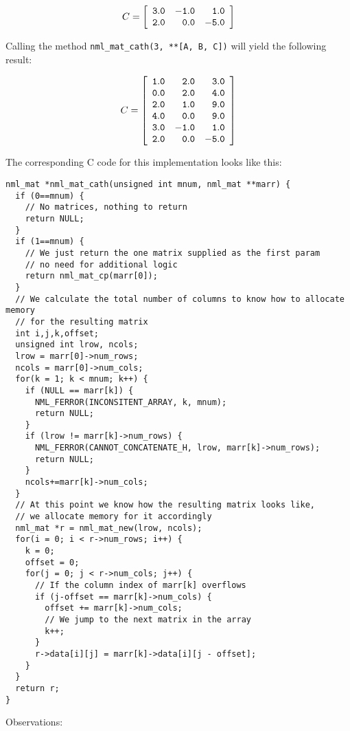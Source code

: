 $$
C = \left[
\begin{array}{rrr}
\tt 3.0 & \tt -1.0 & \tt 1.0 \\
\tt 2.0 & \tt 0.0 & \tt -5.0
\end{array}
\right]
$$

Calling the method {\tt nml\_mat\_cath(3, **[A, B, C])} will yield the following result:

$$
C = \left[
\begin{array}{rrr}
\tt 1.0 & \tt 2.0 & \tt 3.0 \\
\tt 0.0 & \tt 2.0 & \tt 4.0 \\
\tt 2.0 & \tt 1.0 & \tt 9.0 \\
\tt 4.0 & \tt 0.0 & \tt 9.0 \\
\tt 3.0 & \tt -1.0 & \tt 1.0 \\
\tt 2.0 & \tt 0.0 & \tt -5.0
\end{array}
\right]
$$

The corresponding C code for this implementation looks like this:

\begin{verbatim}
nml_mat *nml_mat_cath(unsigned int mnum, nml_mat **marr) {
  if (0==mnum) {
    // No matrices, nothing to return
    return NULL;
  }
  if (1==mnum) {
    // We just return the one matrix supplied as the first param
    // no need for additional logic
    return nml_mat_cp(marr[0]);
  }
  // We calculate the total number of columns to know how to allocate memory
  // for the resulting matrix
  int i,j,k,offset;
  unsigned int lrow, ncols;
  lrow = marr[0]->num_rows;
  ncols = marr[0]->num_cols;
  for(k = 1; k < mnum; k++) {
    if (NULL == marr[k]) {
      NML_FERROR(INCONSITENT_ARRAY, k, mnum);
      return NULL;
    }
    if (lrow != marr[k]->num_rows) {
      NML_FERROR(CANNOT_CONCATENATE_H, lrow, marr[k]->num_rows);
      return NULL;
    }
    ncols+=marr[k]->num_cols;
  }
  // At this point we know how the resulting matrix looks like,
  // we allocate memory for it accordingly
  nml_mat *r = nml_mat_new(lrow, ncols);
  for(i = 0; i < r->num_rows; i++) {
    k = 0;
    offset = 0;
    for(j = 0; j < r->num_cols; j++) {
      // If the column index of marr[k] overflows
      if (j-offset == marr[k]->num_cols) {
        offset += marr[k]->num_cols;
        // We jump to the next matrix in the array
        k++;
      }
      r->data[i][j] = marr[k]->data[i][j - offset];
    }
  }
  return r;
}
\end{verbatim}

Observations:

